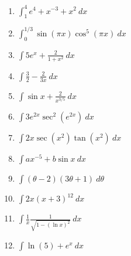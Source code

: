 \documentclass[12pt]{article}
\renewcommand{\emph}[1]{\textsf{\textbf{#1}}}
\newcounter{probcount}
\newcounter{subprobcount}
\newenvironment{subproblems}{%
\begin{enumerate}%
\setcounter{enumi}{\value{subprobcount}}%
\renewcommand{\theenumi}{\emph{\alph{enumi}}}}%
{\setcounter{subprobcount}{\value{enumi}}\end{enumerate}}
\newcommand{\ds}{\displaystyle}
\begin{document}
\begin{subproblems}


\item   $\ds \int_{1}^{4}e^{4}+ x^{-3} +x^{2}\: dx$\\
\vfill %

\item $\ds \int_{0}^{1/3}\sin(\pi x)\cos^{5}(\pi x)\: dx$\\
\vfill%

\item   $\ds \int 5e^{x}+\frac{2}{1+x^{2}} \: dx$ \\
\vfill %

\newpage
\item   $\ds \int \frac{3}{2}-\frac{2}{3x}  \: dx$\\
\vfill %

\item   $\ds \int \sin x+ \frac{2}{x^{3/5}} \: dx$
\vfill %

\item   $\ds \int 3e^{2x}\sec^{2}(e^{2x})  \: dx$ \\
\vfill %

\newpage
\item   $\ds \int 2x \sec(x^{2})\tan(x^{2})\: dx$
\vfill %

\item   $\ds \int a x^{-5}+b\sin x \: dx$  %
\\ 
\vfill %

\item   $\ds \int (\theta -2)(3\theta +1)\: d\theta$\\
\vfill %

\newpage\item   $\ds \int  2x(x+3)^{12}\: dx$ \\%
 \vfill

\item   $\ds \int \frac{1}{x}\frac{1}{\sqrt{1-(\ln x)^{2}}} \: dx$
\vfill %

\item   $\ds \int \ln(5)+e^{x} \: dx$
\vfill

\end{subproblems}
\end{document}
